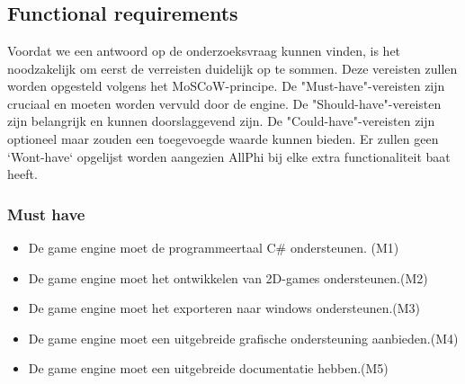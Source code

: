 
\chapter{}%
\label{ch:requirements-analyse}


\section{Functional requirements}
Voordat we een antwoord op de onderzoeksvraag kunnen vinden, is het noodzakelijk om eerst de verreisten duidelijk op te sommen. Deze vereisten zullen worden opgesteld volgens het MoSCoW-principe. De "Must-have"-vereisten zijn cruciaal en moeten worden vervuld door de engine. De "Should-have"-vereisten zijn belangrijk en kunnen doorslaggevend zijn. De "Could-have"-vereisten zijn optioneel maar zouden een toegevoegde waarde kunnen bieden. Er zullen geen `Wont-have` opgelijst worden aangezien AllPhi bij elke extra functionaliteit baat heeft.
\subsection{Must have}
\begin{itemize}
    \item De game engine moet de programmeertaal C\# ondersteunen. (M1)
    \item De game engine moet het ontwikkelen van 2D-games ondersteunen.(M2)
    \item De game engine moet het exporteren naar windows ondersteunen.(M3)
    \item De game engine moet een uitgebreide grafische ondersteuning aanbieden.(M4)
    \item De game engine moet een uitgebreide documentatie hebben.(M5)
\end{itemize}

